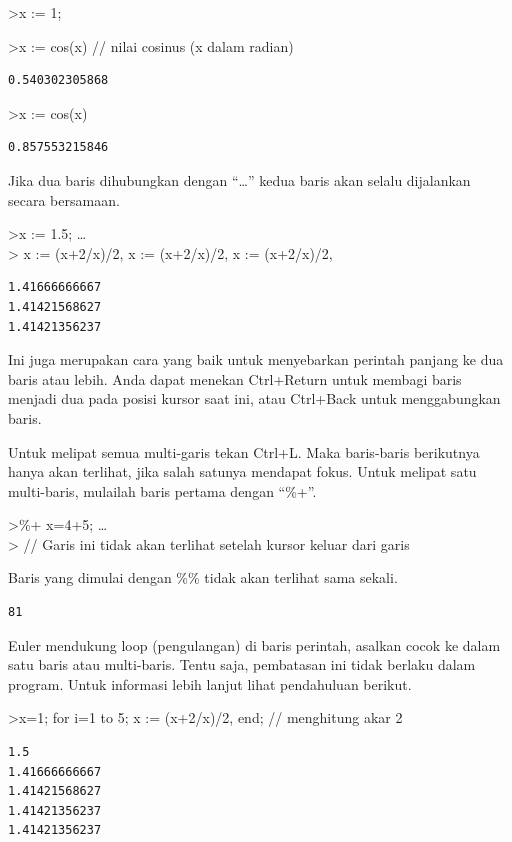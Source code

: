 \documentclass[
]{book}
\begin{document}
\textgreater x := 1;

\textgreater x := cos(x) // nilai cosinus (x dalam radian)

\begin{verbatim}
0.540302305868
\end{verbatim}

\textgreater x := cos(x)

\begin{verbatim}
0.857553215846
\end{verbatim}

Jika dua baris dihubungkan dengan ``\ldots{}'' kedua baris akan selalu dijalankan secara bersamaan.

\textgreater x := 1.5; \ldots{}\\
\textgreater{} x := (x+2/x)/2, x := (x+2/x)/2, x := (x+2/x)/2,

\begin{verbatim}
1.41666666667
1.41421568627
1.41421356237
\end{verbatim}

Ini juga merupakan cara yang baik untuk menyebarkan perintah panjang ke dua baris atau lebih. Anda dapat menekan Ctrl+Return untuk membagi baris menjadi dua pada posisi kursor saat ini, atau Ctrl+Back untuk menggabungkan baris.

Untuk melipat semua multi-garis tekan Ctrl+L. Maka baris-baris berikutnya hanya akan terlihat, jika salah satunya mendapat fokus. Untuk melipat satu multi-baris, mulailah baris pertama dengan ``\%+''.

\textgreater\%+ x=4+5; \ldots{}\\
\textgreater{} // Garis ini tidak akan terlihat setelah kursor keluar dari garis

Baris yang dimulai dengan \%\% tidak akan terlihat sama sekali.

\begin{verbatim}
81
\end{verbatim}

Euler mendukung loop (pengulangan) di baris perintah, asalkan cocok ke dalam satu baris atau multi-baris. Tentu saja, pembatasan ini tidak berlaku dalam program. Untuk informasi lebih lanjut lihat pendahuluan berikut.

\textgreater x=1; for i=1 to 5; x := (x+2/x)/2, end; // menghitung akar 2

\begin{verbatim}
1.5
1.41666666667
1.41421568627
1.41421356237
1.41421356237
\end{verbatim}
\end{document}
